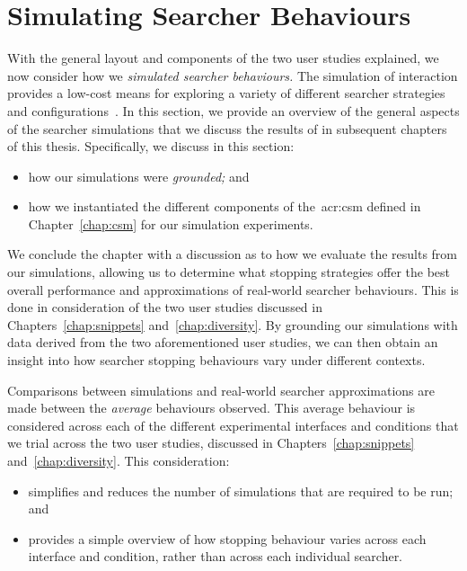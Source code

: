 \section{Simulating Searcher Behaviours}\label{sec:method:simulation}
With the general layout and components of the two user studies explained, we now consider how we \emph{simulated searcher behaviours.} The simulation of interaction provides a low-cost means for exploring a variety of different searcher strategies and configurations~\citep{azzopardi2010workshop}. In this section, we provide an overview of the general aspects of the  searcher simulations that we discuss the results of in subsequent chapters of this thesis. Specifically, we discuss in this section:

\begin{itemize}
    \item{how our simulations were \emph{grounded;} and}
    \item{how we instantiated the different components of the~\gls{acr:csm} defined in Chapter~\ref{chap:csm} for our simulation experiments.}
\end{itemize}

We conclude the chapter with a discussion as to how we evaluate the results from our simulations, allowing us to determine what stopping strategies offer the best overall performance and approximations of real-world searcher behaviours. This is done in consideration of the two user studies discussed in Chapters~\ref{chap:snippets} and~\ref{chap:diversity}. By grounding our simulations with data derived from the two aforementioned user studies, we can then obtain an insight into how searcher stopping behaviours vary under different contexts.

 Comparisons between simulations and real-world searcher approximations are made between the \emph{average} behaviours observed. This average behaviour is considered across each of the different experimental interfaces and conditions that we trial across the two user studies, discussed in Chapters~\ref{chap:snippets} and~\ref{chap:diversity}. This consideration:

\begin{itemize}
    \item{simplifies and reduces the number of simulations that are required to be run; and}
    \item{provides a simple overview of how stopping behaviour varies across each interface and condition, rather than across each individual searcher.}
\end{itemize}

